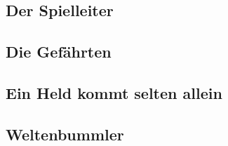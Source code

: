\subsection{Der Spielleiter}\label{subsec:gamemaster}


\subsection{Die Gefährten}\label{subsec:npcs}


\subsection{Ein Held kommt selten allein}\label{subsec:connecting_friends}


\subsection{Weltenbummler}\label{subsec:its_a_whole_new_world}
